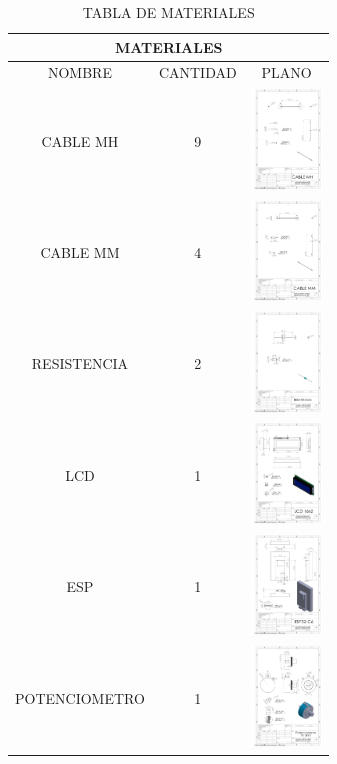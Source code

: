         \begin{table}[H]
        \huge
        \tiny
        \begin{tabular} {|c|c|c|}
        \hline
        \multicolumn{3}{|c|}{MATERIALES} \\
        \hline 
        NOMBRE & CANTIDAD & PLANO\\
        \hline
        CABLE MH & 9 & \includegraphics[width=19mm]{13/img/PlanoCableMh.pdf} \\
        \hline
        CABLE MM & 4 & \includegraphics[width=19mm]{13/img/PlanoCableMm.pdf}\\
        \hline
        RESISTENCIA & 2 & \includegraphics[width=19mm]{13/img/PlanoResistencia.pdf}\\
        \hline
        LCD & 1 & \includegraphics[width=19mm]{13/img/PlanoLcd.pdf}\\
        \hline
        ESP & 1 & \includegraphics[width=19mm]{13/img/PlanoEsp.pdf}\\
        \hline
         POTENCIOMETRO & 1 & \includegraphics[width=19mm]{13/img/PlanoPotenciometro.pdf}\\
        \hline
        \end{tabular}
        \caption{TABLA DE MATERIALES}
        \label{tab:my_label}
    \end{table}
    
